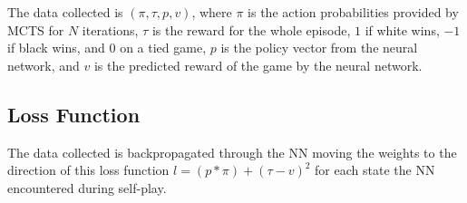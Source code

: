 The data collected is $(\pi, \tau, p, v)$, where $\pi$ is the action probabilities provided by 
MCTS for $N$ iterations, $\tau$ is the reward for the whole episode, $1$ if white wins,
$-1$ if black wins, and $0$ on a tied game, $p$ is the policy vector
from the neural network, and $v$ is the predicted reward of the game by the neural network.

\subsection{Loss Function}
The data collected is backpropagated through the NN moving the weights to the direction of this 
loss function $l = (p * \pi) + (\tau - v)^2$ for each state the NN encountered during self-play. 